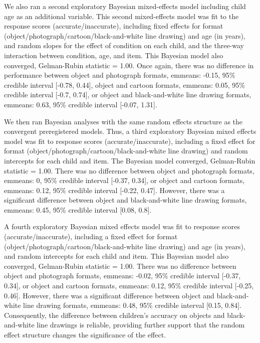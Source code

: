 \documentclass[10pt, letterpaper]{article}
\begin{document}
We also ran a second exploratory Bayesian mixed-effects model including
child age as an additional variable. This second mixed-effects model was
fit to the response scores (accurate/inaccurate), including fixed
effects for format (object/photograph/cartoon/black-and-white line
drawing) and age (in years), and random slopes for the effect of
condition on each child, and the three-way interaction between
condition, age, and item. This Bayesian model also converged,
Gelman-Rubin statistic = 1.00. Once again, there was no difference in
performance between object and photograph formats, emmeans: -0.15, 95\%
credible interval {[}-0.78, 0.44{]}, object and cartoon formats,
emmeans: 0.05, 95\% credible interval {[}-0.7, 0.74{]}, or object and
black-and-white line drawing formats, emmeans: 0.63, 95\% credible
interval {[}-0.07, 1.31{]}.

We then ran Bayesian analyses with the same random effects structure as
the convergent preregistered models. Thus, a third exploratory Bayesian
mixed effects model was fit to response scores (accurate/inaccurate),
including a fixed effect for format
(object/photograph/cartoon/black-and-white line drawing) and random
intercepts for each child and item. The Bayesian model converged,
Gelman-Rubin statistic = 1.00. There was no difference between object
and photograph formats, emmeans: 0, 95\% credible interval {[}-0.37,
0.34{]}, or object and cartoon formats, emmeans: 0.12, 95\% credible
interval {[}-0.22, 0.47{]}. However, there was a significant difference
between object and black-and-white line drawing formats, emmeans: 0.45,
95\% credible interval {[}0.08, 0.8{]}.

A fourth exploratory Bayesian mixed effects model was fit to response
scores (accurate/inaccurate), including a fixed effect for format
(object/photograph/cartoon/black-and-white line drawing) and age (in
years), and random intercepts for each child and item. This Bayesian
model also converged, Gelman-Rubin statistic = 1.00. There was no
difference between object and photograph formats, emmeans: -0.02, 95\%
credible interval {[}-0.37, 0.34{]}, or object and cartoon formats,
emmeans: 0.12, 95\% credible interval {[}-0.25, 0.46{]}. However, there
was a significant difference between object and black-and-white line
drawing formats, emmeans: 0.48, 95\% credible interval {[}0.15, 0.84{]}.
Consequently, the difference between children's accuracy on objects and
black-and-white line drawings is reliable, providing further support
that the random effect structure changes the significance of the effect.
\end{document}
